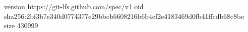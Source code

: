 version https://git-lfs.github.com/spec/v1
oid sha256:2bf3b7e340d0774377e29bbeb6608216b6b4cf2e4183469d0fb41ffcdb68c8be
size 430999

